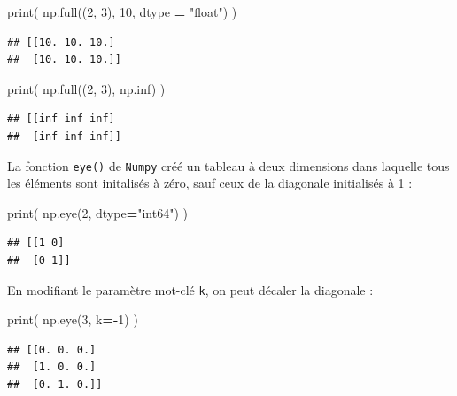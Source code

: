 \documentclass[12pt,]{book}
\newenvironment{Shaded}{\begin{snugshade}}{\end{snugshade}}
\newcommand{\DecValTok}[1]{\textcolor[rgb]{0.00,0.00,0.81}{#1}}
\newcommand{\StringTok}[1]{\textcolor[rgb]{0.31,0.60,0.02}{#1}}
\newcommand{\OperatorTok}[1]{\textcolor[rgb]{0.81,0.36,0.00}{\textbf{#1}}}
\newcommand{\BuiltInTok}[1]{#1}
\newcommand{\NormalTok}[1]{#1}
\numberwithin{equation}{section}
\numberwithin{countremarque}{section}
\begin{document}
\begin{Shaded}
\begin{Highlighting}[]
\BuiltInTok{print}\NormalTok{( np.full((}\DecValTok{2}\NormalTok{, }\DecValTok{3}\NormalTok{), }\DecValTok{10}\NormalTok{, dtype }\OperatorTok{=} \StringTok{"float"}\NormalTok{) )}
\end{Highlighting}
\end{Shaded}

\begin{lstlisting}
## [[10. 10. 10.]
##  [10. 10. 10.]]
\end{lstlisting}

\begin{Shaded}
\begin{Highlighting}[]
\BuiltInTok{print}\NormalTok{( np.full((}\DecValTok{2}\NormalTok{, }\DecValTok{3}\NormalTok{), np.inf) )}
\end{Highlighting}
\end{Shaded}

\begin{lstlisting}
## [[inf inf inf]
##  [inf inf inf]]
\end{lstlisting}

La fonction \texttt{eye()} de \texttt{Numpy} créé un tableau à deux
dimensions dans laquelle tous les éléments sont initalisés à zéro, sauf
ceux de la diagonale initialisés à 1 :

\begin{Shaded}
\begin{Highlighting}[]
\BuiltInTok{print}\NormalTok{( np.eye(}\DecValTok{2}\NormalTok{, dtype}\OperatorTok{=}\StringTok{"int64"}\NormalTok{) )}
\end{Highlighting}
\end{Shaded}

\begin{lstlisting}
## [[1 0]
##  [0 1]]
\end{lstlisting}

En modifiant le paramètre mot-clé \texttt{k}, on peut décaler la
diagonale :

\begin{Shaded}
\begin{Highlighting}[]
\BuiltInTok{print}\NormalTok{( np.eye(}\DecValTok{3}\NormalTok{, k}\OperatorTok{=-}\DecValTok{1}\NormalTok{) )}
\end{Highlighting}
\end{Shaded}

\begin{lstlisting}
## [[0. 0. 0.]
##  [1. 0. 0.]
##  [0. 1. 0.]]
\end{lstlisting}
\end{document}
